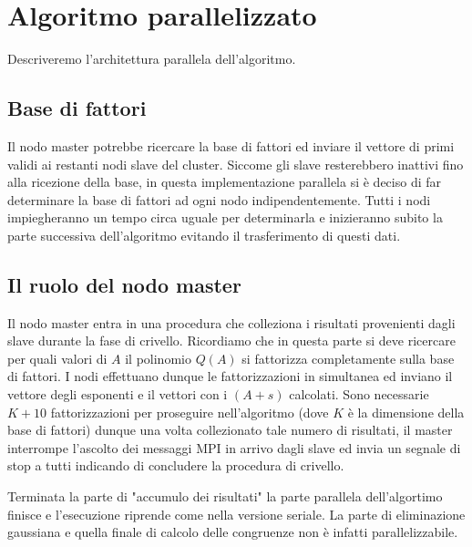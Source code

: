 \section{Algoritmo parallelizzato}
\label{sec:parallelo}
Descriveremo l'architettura parallela dell'algoritmo.
\subsection{Base di fattori}
Il nodo master potrebbe ricercare la base di fattori ed inviare il
vettore di primi validi ai restanti nodi slave del cluster. Siccome
gli slave resterebbero inattivi fino alla ricezione della base, in
questa implementazione parallela si è deciso di far determinare la
base di fattori ad ogni nodo indipendentemente. Tutti i nodi
impiegheranno un tempo circa uguale per determinarla e inizieranno
subito la parte successiva dell'algoritmo evitando il trasferimento di
questi dati.
\subsection{Il ruolo del nodo master}
Il nodo master entra in una procedura che colleziona i risultati
provenienti dagli slave durante la fase di crivello. Ricordiamo che in
questa parte si deve ricercare per quali valori di $A$ il polinomio $Q(A)$
si fattorizza completamente sulla base di fattori. I nodi effettuano
dunque le fattorizzazioni in simultanea ed
inviano il vettore degli esponenti e il vettori con i $(A + s)$
calcolati. Sono necessarie $K+10$ fattorizzazioni per proseguire
nell'algoritmo (dove $K$ è la dimensione della base di fattori) dunque
una volta collezionato tale numero di risultati, il master interrompe
l'ascolto dei messaggi MPI in arrivo dagli slave ed invia un segnale
di stop a tutti indicando di concludere la procedura di crivello.

Terminata la parte di "accumulo dei risultati" la parte parallela
dell'algortimo finisce e l'esecuzione riprende come nella versione
seriale. La parte di eliminazione gaussiana e quella finale di calcolo
delle congruenze non è infatti parallelizzabile.


